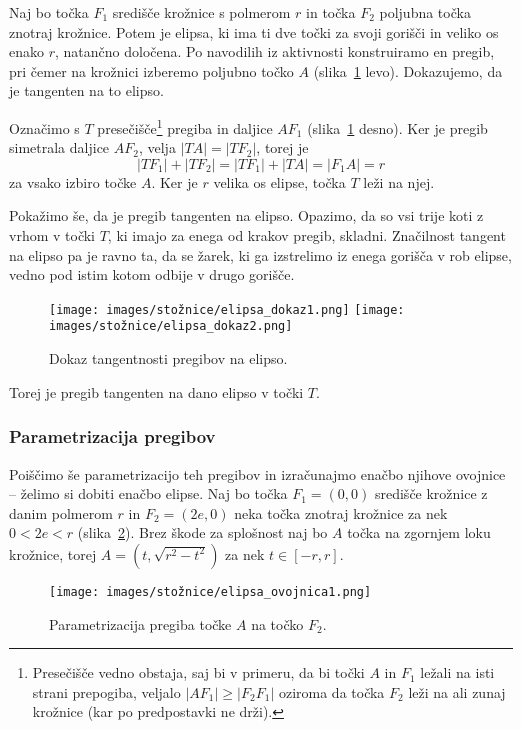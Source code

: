 \begin{dokaz}
    Naj bo točka $F_1$ središče krožnice s polmerom $r$ in točka $F_2$ poljubna točka znotraj krožnice. Potem je elipsa, ki ima ti dve točki za svoji gorišči in veliko os enako $r$, natančno določena. Po navodilih iz aktivnosti konstruiramo en pregib, pri čemer na krožnici izberemo poljubno točko $A$ (slika~\ref{fig:dokaz_elipsa} levo). Dokazujemo, da je tangenten na to elipso.

    Označimo s $T$ presečišče\footnote{Presečišče vedno obstaja, saj bi v primeru, da bi točki $A$ in $F_1$ ležali na isti strani prepogiba, veljalo $|AF_1| \geq |F_2F_1|$ oziroma da točka $F_2$ leži na ali zunaj krožnice (kar po predpostavki ne drži).} pregiba in daljice $AF_1$ (slika~\ref{fig:dokaz_elipsa} desno). Ker je pregib simetrala daljice $AF_2$, velja $|TA| = |TF_2|$, torej je
    $$|TF_1| + |TF_2| = |TF_1| + |TA| = |F_1A| = r$$
    za vsako izbiro točke $A$. Ker je $r$ velika os elipse, točka $T$ leži na njej.

    Pokažimo še, da je pregib tangenten na elipso. Opazimo, da so vsi trije koti z vrhom v točki $T$, ki imajo za enega od krakov pregib, skladni. Značilnost tangent na elipso pa je ravno ta, da se žarek, ki ga izstrelimo iz enega gorišča v rob elipse, vedno pod istim kotom odbije v drugo gorišče.
    \begin{figure}[h]
        \centering
        \texttt{[image: images/stožnice/elipsa\_dokaz1.png]}
        \texttt{[image: images/stožnice/elipsa\_dokaz2.png]}
        \caption[Tangentnost na elipso]{Dokaz tangentnosti pregibov na elipso.}
        \label{fig:dokaz_elipsa}
    \end{figure}
    
    Torej je pregib tangenten na dano elipso v točki $T$.
\end{dokaz}

\subsubsection*{Parametrizacija pregibov}

Poiščimo še parametrizacijo teh pregibov in izračunajmo enačbo njihove ovojnice -- želimo si dobiti enačbo elipse. Naj bo točka $F_1 = (0,0)$ središče krožnice z danim polmerom $r$ in $F_2 = (2e,0)$ neka točka znotraj krožnice za nek $0 < 2e < r$ (slika~\ref{fig:enacba_elipse}). Brez škode za splošnost naj bo $A$ točka na zgornjem loku krožnice, torej $A = (t, \sqrt{r^2-t^2})$ za nek $t \in [-r, r]$.
\begin{figure}[h]
    \centering
    \texttt{[image: images/stožnice/elipsa\_ovojnica1.png]}
    \caption[Enačba tangente na elipso]{Parametrizacija pregiba točke $A$ na točko $F_2$.}
    \label{fig:enacba_elipse}
\end{figure}

